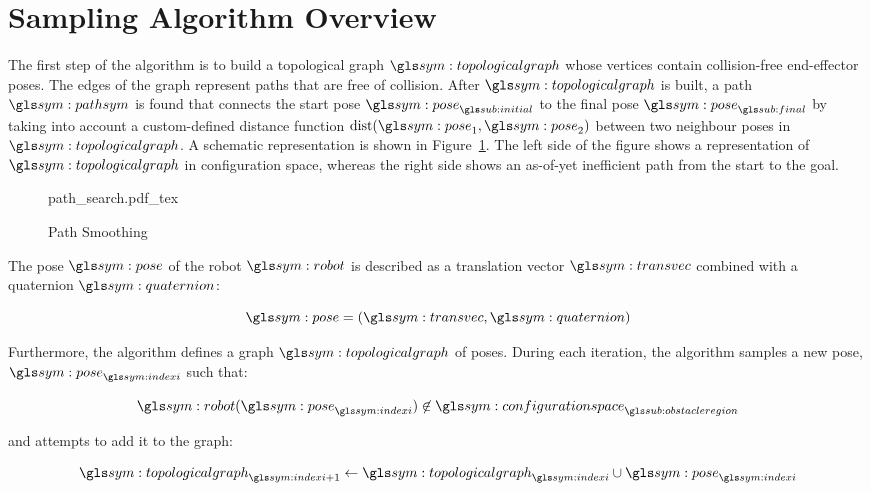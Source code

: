 \section{Sampling Algorithm Overview}%
\label{sec:algorithm_overview}


	The first step of the algorithm is to build a topological graph
	$\topologicalgraph$ whose vertices contain collision-free end-effector
	poses. The edges of the graph represent paths that are free of collision.
	After $\topologicalgraph$ is built, a path $\pathsym$ is found that connects
	the start pose $\pose_{\initial}$ to the final pose $\pose_{\final}$ by
	taking into account a custom-defined distance function $\dist(\pose_1,
	\pose_2)$ between two neighbour poses in $\topologicalgraph$. A schematic
	representation is shown in Figure~\ref{fig:path_search}. The left side of
	the figure shows a representation of $\topologicalgraph$ in configuration
	space, whereas the right side shows an as-of-yet inefficient path from the
	start to the goal.

	\begin{figure}[hb]
		\centering
		\def\svgwidth{\columnwidth}
		{path_search.pdf_tex}
		\caption{Path Smoothing}%
		\label{fig:path_search}
	\end{figure}


	The pose $\pose$ of the robot $\robot$ is described as a translation
	vector $\transvec$ combined with a quaternion $\quaternion$:

	\begin{equation}
		\pose = (\transvec, \quaternion)
	\end{equation}

	Furthermore, the algorithm defines a graph $\topologicalgraph$ of poses.
	During each iteration, the algorithm samples a new pose,
	$\pose_{\indexi}$ such that:

	\begin{equation}
		\robot(\pose_{\indexi}) \not\in
		\configurationspace_{\obstacleregion}
	\end{equation}

	and attempts to add it to the graph:

	\begin{equation}
		\topologicalgraph_{\indexi + 1} \leftarrow
			\topologicalgraph_{\indexi} \cup \pose_{\indexi}
	\end{equation}

